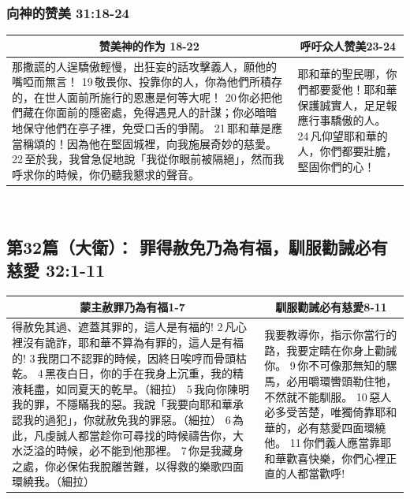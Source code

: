 \subsubsection{向神的赞美 31:18-24}
\begin{table}[H]
\centering
\begin{tabular}{p{}|p{4.25cm}}\hline\hline
\multicolumn{1}{c|}{赞美神的作为 18-22}&\multicolumn{1}{c}{呼吁众人赞美23-24}\\\hline
那撒謊的人逞驕傲輕慢，出狂妄的話攻擊義人，願他的嘴啞而無言！
19 敬畏你、投靠你的人，你為他們所積存的，在世人面前所施行的恩惠是何等大呢！
20 你必把他們藏在你面前的隱密處，免得遇見人的計謀；你必暗暗地保守他們在亭子裡，免受口舌的爭鬧。
21 耶和華是應當稱頌的！因為他在堅固城裡，向我施展奇妙的慈愛。
22 至於我，我曾急促地說「我從你眼前被隔絕」，然而我呼求你的時候，你仍聽我懇求的聲音。
&耶和華的聖民哪，你們都要愛他！耶和華保護誠實人，足足報應行事驕傲的人。
24 凡仰望耶和華的人，你們都要壯膽，堅固你們的心！\\\hline
\end{tabular}
\end{table} 



\subsection{第32篇（大衛）： 罪得赦免乃為有福，馴服勸誡必有慈愛 32:1-11}
\begin{table}[H]
\centering
\begin{tabular}{p{}|p{}}\hline\hline
\multicolumn{1}{c|}{蒙主赦罪乃為有福1-7}&\multicolumn{1}{c}{馴服勸誡必有慈愛8-11}\\\hline
得赦免其過、遮蓋其罪的，這人是有福的!
2 凡心裡沒有詭詐，耶和華不算為有罪的，這人是有福的!
3 我閉口不認罪的時候，因終日唉哼而骨頭枯乾。
4 黑夜白日，你的手在我身上沉重，我的精液耗盡，如同夏天的乾旱。（細拉）
5 我向你陳明我的罪，不隱瞞我的惡。我說「我要向耶和華承認我的過犯」，你就赦免我的罪惡。（細拉）
6 為此，凡虔誠人都當趁你可尋找的時候禱告你，大水泛溢的時候，必不能到他那裡。
7 你是我藏身之處，你必保佑我脫離苦難，以得救的樂歌四面環繞我。（細拉）
&我要教導你，指示你當行的路，我要定睛在你身上勸誡你。
9 你不可像那無知的騾馬，必用嚼環轡頭勒住牠，不然就不能馴服。
10 惡人必多受苦楚，唯獨倚靠耶和華的，必有慈愛四面環繞他。
11 你們義人應當靠耶和華歡喜快樂，你們心裡正直的人都當歡呼!\\\hline
\end{tabular}
\end{table} 


